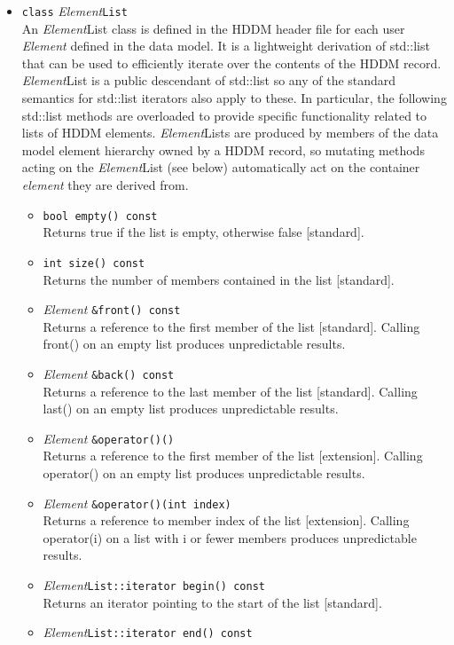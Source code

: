 \documentclass{revtex4}
\begin{document}
\begin{itemize}
\item \texttt{class} {\em  Element}\texttt{List}\\
An {\em Element}List class is defined in the HDDM header file for each user
{\em Element}
defined in the data model. It is a lightweight derivation of std::list that
can be used to efficiently iterate over the contents of the HDDM record.
{\em Element}List is a public descendant of std::list so any of the standard
semantics for std::list iterators also apply to these. In particular, the
following std::list methods are overloaded to provide specific functionality
related to lists of HDDM elements. {\em Element}Lists are produced by members
of the data model element hierarchy owned by a HDDM record, so mutating methods
acting on the {\em Element}List (see below) automatically act on the container
{\em element} they are derived from.
\begin{itemize}
\item \texttt{bool empty() const}\\
Returns true if the list is empty, otherwise false [standard].
\item \texttt{int size() const}\\
Returns the number of members contained in the list [standard].
\item {\em Element} \texttt{\&front() const}\\
Returns a reference to the first member of the list [standard]. Calling
front() on an empty list produces unpredictable results.
\item {\em Element} \texttt{\&back() const}\\
Returns a reference to the last member of the list [standard]. Calling last()
on an empty list produces unpredictable results.
\item {\em Element} \texttt{\&operator()()}\\
Returns a reference to the first member of the list [extension]. Calling
operator() on an empty list produces unpredictable results.
\item {\em Element} \texttt{\&operator()(int index)}\\
Returns a reference to member index of the list [extension]. Calling
operator(i) on a list with i or fewer members produces unpredictable results.
\item {\em Element}\texttt{List::iterator begin() const}\\
Returns an iterator pointing to the start of the list [standard].
\item {\em Element}\texttt{List::iterator end() const}\\

\end{itemize}
\end{itemize}
\end{document}
